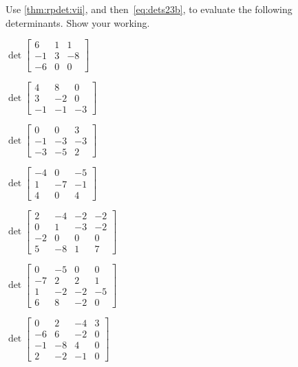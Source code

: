 \begin{exercise} \label{ex:} 
Use \autoref{thm:rpdet:vii}, and then~\eqref{eq:dets23b}, to evaluate the following determinants.
Show your working.
\begin{parts}
\item \(\det\begin{bmatrix} 6 & 1 & 1
\\-1 & 3 & -8
\\-6 & 0 & 0 \end{bmatrix}\)

\item \(\det\begin{bmatrix} 4 & 8 & 0
\\3 & -2 & 0
\\-1 & -1 & -3 \end{bmatrix}\)

\item \(\det\begin{bmatrix} 0 & 0 & 3
\\-1 & -3 & -3
\\-3 & -5 & 2 \end{bmatrix}\)

\item \(\det\begin{bmatrix} -4 & 0 & -5
\\1 & -7 & -1
\\4 & 0 & 4 \end{bmatrix}\)

\item \(\det\begin{bmatrix} 2 & -4 & -2 & -2
\\0 & 1 & -3 & -2
\\-2 & 0 & 0 & 0
\\5 & -8 & 1 & 7 \end{bmatrix}\)

\item \(\det\begin{bmatrix} 0 & -5 & 0 & 0
\\-7 & 2 & 2 & 1
\\1 & -2 & -2 & -5
\\6 & 8 & -2 & 0 \end{bmatrix}\)

\item \(\det\begin{bmatrix} 0 & 2 & -4 & 3
\\-6 & 6 & -2 & 0
\\-1 & -8 & 4 & 0
\\2 & -2 & -1 & 0 \end{bmatrix}\)


\end{parts}
\end{exercise}
